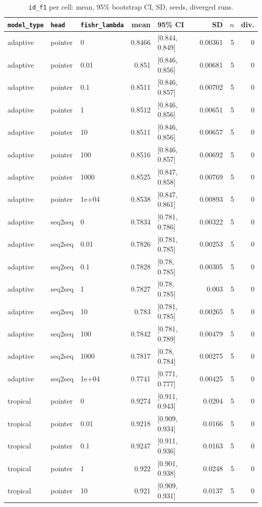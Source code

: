 \documentclass[10pt]{article}
\begin{document}
{\small
\begin{longtable}{lllrlrrr}
\caption{\texttt{id\_f1} per cell: mean, 95\% bootstrap CI, SD, seeds, diverged runs.}\label{tab:summary-id_f1}\\
\toprule
\texttt{model\_type} & \texttt{head} & \texttt{fishr\_lambda} & mean & 95\% CI & SD & $n$ & div.\\
\midrule
\endhead
adaptive & pointer & 0 & 0.8466 & [0.844, 0.849] & 0.00361 & 5 & 0\\
adaptive & pointer & 0.01 & 0.851 & [0.846, 0.856] & 0.00681 & 5 & 0\\
adaptive & pointer & 0.1 & 0.8511 & [0.846, 0.857] & 0.00702 & 5 & 0\\
adaptive & pointer & 1 & 0.8512 & [0.846, 0.856] & 0.00651 & 5 & 0\\
adaptive & pointer & 10 & 0.8511 & [0.846, 0.856] & 0.00657 & 5 & 0\\
adaptive & pointer & 100 & 0.8516 & [0.846, 0.857] & 0.00692 & 5 & 0\\
adaptive & pointer & 1000 & 0.8525 & [0.847, 0.858] & 0.00769 & 5 & 0\\
adaptive & pointer & 1e+04 & 0.8538 & [0.847, 0.861] & 0.00893 & 5 & 0\\
adaptive & seq2seq & 0 & 0.7834 & [0.781, 0.786] & 0.00322 & 5 & 0\\
adaptive & seq2seq & 0.01 & 0.7826 & [0.781, 0.785] & 0.00253 & 5 & 0\\
adaptive & seq2seq & 0.1 & 0.7828 & [0.78, 0.785] & 0.00305 & 5 & 0\\
adaptive & seq2seq & 1 & 0.7827 & [0.78, 0.785] & 0.003 & 5 & 0\\
adaptive & seq2seq & 10 & 0.783 & [0.781, 0.785] & 0.00265 & 5 & 0\\
adaptive & seq2seq & 100 & 0.7842 & [0.781, 0.789] & 0.00479 & 5 & 0\\
adaptive & seq2seq & 1000 & 0.7817 & [0.78, 0.784] & 0.00275 & 5 & 0\\
adaptive & seq2seq & 1e+04 & 0.7741 & [0.771, 0.777] & 0.00425 & 5 & 0\\
tropical & pointer & 0 & 0.9274 & [0.911, 0.943] & 0.0204 & 5 & 0\\
tropical & pointer & 0.01 & 0.9218 & [0.909, 0.934] & 0.0166 & 5 & 0\\
tropical & pointer & 0.1 & 0.9247 & [0.911, 0.936] & 0.0163 & 5 & 0\\
tropical & pointer & 1 & 0.922 & [0.901, 0.938] & 0.0248 & 5 & 0\\
tropical & pointer & 10 & 0.921 & [0.909, 0.931] & 0.0137 & 5 & 0\\

\end{longtable}}
\end{document}
